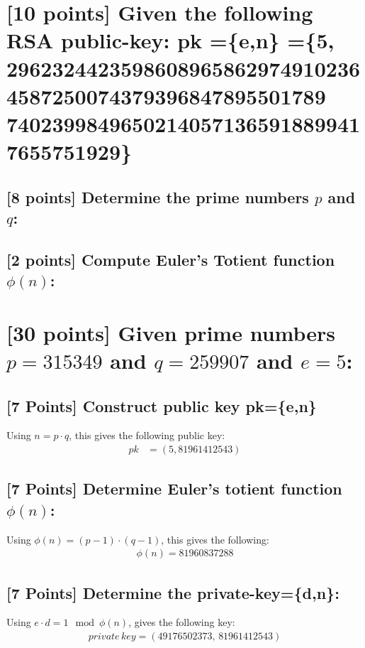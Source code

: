 \documentclass{article}
\begin{document}
\section{[10 points] Given the following RSA public-key: pk =\{e,n\} =\{5, 29623244235986089658629749102364587250074379396847895501789\\
74023998496502140571365918899417655751929\}}
\subsection{[8 points] Determine the prime numbers $p$ and $q$:}
\vspace{.5in}
\subsection{[2 points] Compute Euler's Totient function $\phi(n)$:}
\vspace{.5in}


\section{[30 points] Given prime numbers $p=315349$ and $q=259907$ and $e=5$:}
\subsection{[7 Points] Construct public key pk=\{e,n\}}
Using $n = p \cdot q$, this gives the following public key:
\begin{align*}
pk &= (5, 81961412543)
\end{align*}

\subsection{[7 Points] Determine Euler's totient function $\phi(n)$:}
Using $\phi(n) = (p-1) \cdot (q-1)$, this gives the following:
\begin{align*}
\phi(n) = 81960837288
\end{align*}

\subsection{[7 Points] Determine the private-key=\{d,n\}:}
Using $e \cdot d = 1 \mod \phi(n)$, gives the following key:
\begin{align*}
private \, key = (49176502373, \, 81961412543)
\end{align*}
\end{document}
